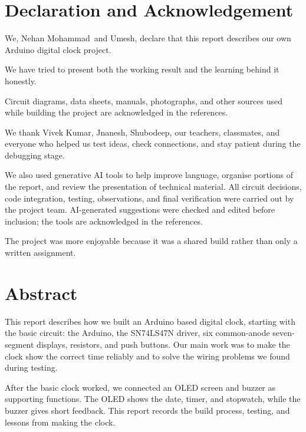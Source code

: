 \documentclass[12pt,letterpaper]{article}
\newcommand{\TeamMemberOne}{Nehan Mohammad}
\newcommand{\TeamMemberTwo}{Umesh}
\newcommand{\GuideName}{Vivek Kumar, Jnanesh, Shubodeep}
\begin{document}
\section*{Declaration and Acknowledgement}


We, \TeamMemberOne\ and \TeamMemberTwo,
declare that this report describes our own Arduino
digital clock project.

We have tried to present both the working result
and the learning behind it honestly.

Circuit diagrams, data sheets, manuals,
photographs, and other sources used while building
the project are acknowledged in the references.

We thank \GuideName, our teachers, classmates,
and everyone who helped us test ideas, check
connections, and stay patient during the debugging
stage.

We also used generative AI tools to help improve language,
organise portions of the report, and review the presentation
of technical material. All circuit decisions, code integration,
testing, observations, and final verification were carried out
by the project team. AI-generated suggestions were checked and
edited before inclusion; the tools are acknowledged in the
references.

The project was more enjoyable because it was a
shared build rather than only a written assignment.

\section*{Abstract}


This report describes how we built an Arduino based
digital clock, starting with the basic circuit: the Arduino,
the SN74LS47N driver, six common-anode seven-segment displays,
resistors, and push buttons. Our main work was to make the
clock show the correct time reliably and to solve the wiring
problems we found during testing.

After the basic clock worked, we connected an OLED screen
and buzzer as supporting functions. The OLED shows the date,
timer, and stopwatch, while the buzzer gives short feedback.
This report records the build process, testing, and lessons
from making the clock.
\end{document}
